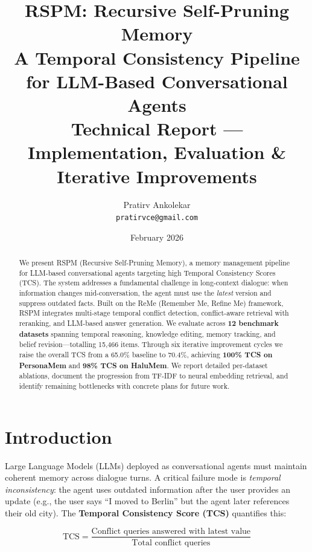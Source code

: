 \documentclass[11pt,a4paper]{article}
\title{%
    \textbf{RSPM: Recursive Self-Pruning Memory} \\[6pt]
    \large A Temporal Consistency Pipeline for LLM-Based Conversational Agents \\[4pt]
    \normalsize Technical Report --- Implementation, Evaluation \& Iterative Improvements
}
\author{%
    Pratirv Ankolekar \\
    \texttt{pratirvce@gmail.com}
}
\date{February 2026}
\begin{document}
\maketitle

\begin{abstract}
We present RSPM (Recursive Self-Pruning Memory), a memory management pipeline
for LLM-based conversational agents targeting high Temporal Consistency Scores
(TCS). The system addresses a fundamental challenge in long-context dialogue:
when information changes mid-conversation, the agent must use the \emph{latest}
version and suppress outdated facts. Built on the ReMe (Remember Me, Refine Me)
framework, RSPM integrates multi-stage temporal conflict detection,
conflict-aware retrieval with reranking, and LLM-based answer generation.  We
evaluate across \textbf{12 benchmark datasets} spanning temporal reasoning,
knowledge editing, memory tracking, and belief revision---totalling 15{,}466
items.  Through six iterative improvement cycles we raise the overall TCS from a
65.0\% baseline to 70.4\%, achieving \textbf{100\% TCS on PersonaMem} and
\textbf{98\% TCS on HaluMem}.  We report detailed per-dataset ablations,
document the progression from TF-IDF to neural embedding retrieval, and
identify remaining bottlenecks with concrete plans for future work.
\end{abstract}

\tableofcontents
\newpage

\section{Introduction}
\label{sec:intro}

Large Language Models (LLMs) deployed as conversational agents must maintain
coherent memory across dialogue turns.  A critical failure mode is
\emph{temporal inconsistency}: the agent uses outdated information after the
user provides an update (e.g., the user says ``I moved to Berlin'' but the
agent later references their old city).  The \textbf{Temporal Consistency Score
(TCS)} quantifies this:

\begin{equation}
    \text{TCS} = \frac{\text{Conflict queries answered with latest value}}
                      {\text{Total conflict queries}}
\label{eq:tcs}
\end{equation}
\end{document}
